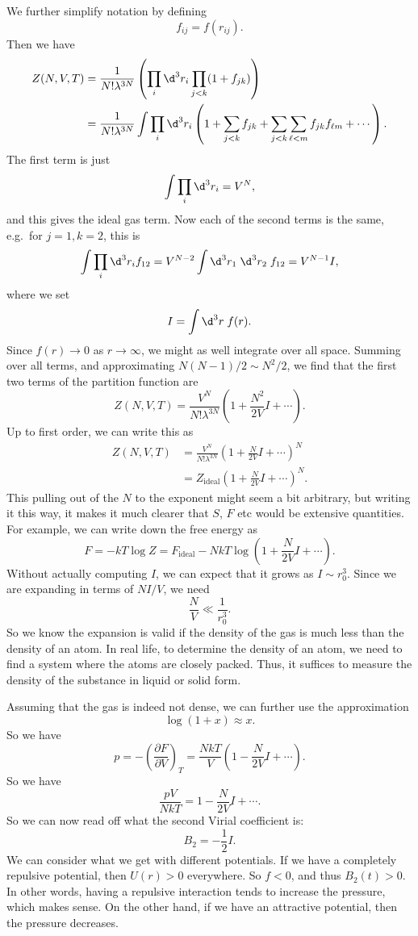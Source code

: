\documentclass[a4paper]{article}
\begin{document}
We further simplify notation by defining
\[
  f_{ij} = f(r_{ij}).
\]
Then we have
\begin{align*}
  Z(N, V, T) &= \frac{1}{N! \lambda^{3N}} \left(\prod_i \d^3 r_i\prod_{j < k} (1 + f_{jk})\right)\\
  &= \frac{1}{N!\lambda^{3N}} \int \prod_i \d^3 r_i \left(1 + \sum_{j < k} f_{jk} + \sum_{j < k} \sum_{\ell < m} f_{jk} f_{\ell m} + \cdots\right).
\end{align*}
The first term is just
\[
  \int \prod_i \d^3 r_i = V^N,
\]
and this gives the ideal gas term. Now each of the second terms is the same, e.g.\ for $j = 1, k = 2$, this is
\[
  \int \prod_i \d^3 r_i f_{12} = V^{N - 2} \int \d^3 r_1 \; \d^3 r_2\; f_{12} = V^{N - 1} I,
\]
where we set
\[
  I = \int\d^3 r\; f(r).
\]
Since $f(r) \to 0$ as $r \to \infty$, we might as well integrate over all space. Summing over all terms, and approximating $N(N - 1)/2 \sim N^2/2$, we find that the first two terms of the partition function are
\[
  Z(N, V, T) = \frac{V^N}{N! \lambda^{3N}} \left(1 + \frac{N^2}{2V}I + \cdots\right).
\]
Up to first order, we can write this as
\begin{align*}
  Z(N, V, T) &= \frac{V^N}{N! \lambda^{3N}} \left(1 + \frac{N}{2V}I + \cdots\right)^N\\
  &= Z_{\mathrm{ideal}} \left(1 + \frac{N}{2V}I + \cdots \right)^N.
\end{align*}
This pulling out of the $N$ to the exponent might seem a bit arbitrary, but writing it this way, it makes it much clearer that $S$, $F$ etc would be extensive quantities. For example, we can write down the free energy as
\[
  F = -kT \log Z = F_{\mathrm{ideal}} - NkT \log \left(1 + \frac{N}{2V} I + \cdots\right).
\]
Without actually computing $I$, we can expect that it grows as $I \sim r_0^3$. Since we are expanding in terms of $NI/V$, we need
\[
  \frac{N}{V} \ll \frac{1}{r_0^3}.
\]
So we know the expansion is valid if the density of the gas is much less than the density of an atom. In real life, to determine the density of an atom, we need to find a system where the atoms are closely packed. Thus, it suffices to measure the density of the substance in liquid or solid form.

Assuming that the gas is indeed not dense, we can further use the approximation
\[
  \log(1 + x) \approx x.
\]
So we have
\[
  p = - \left(\frac{\partial F}{\partial V}\right)_T = \frac{NkT}{V}\left(1 - \frac{N}{2V} I + \cdots\right).
\]
So we have
\[
  \frac{pV}{NkT} = 1 - \frac{N}{2V} I + \cdots.
\]
So we can now read off what the second Virial coefficient is:
\[
  B_2 = -\frac{1}{2} I.
\]
We can consider what we get with different potentials. If we have a completely repulsive potential, then $U(r) > 0$ everywhere. So $f < 0$, and thus $B_2(t) > 0$. In other words, having a repulsive interaction tends to increase the pressure, which makes sense. On the other hand, if we have an attractive potential, then the pressure decreases.
\end{document}
